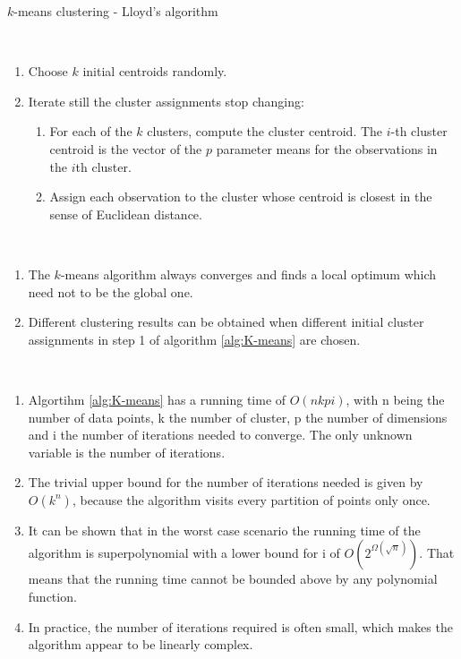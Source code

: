	
\begin{algorithm}
	\caption{$k$-means clustering \cite{Introducion_Stat_Learning} - Lloyd's algorithm}\label{alg:K-means}
\begin{algorithmic}
\\
	\begin{enumerate}
	\item Choose $k$ initial centroids randomly.
	\item  \label{lev:K-means_two}Iterate still the cluster assignments stop changing:
	\begin{enumerate}[label=\emph{\alph*})]
		\item \label{lev:K-means_two_a} For each of the $k$ clusters, compute the cluster centroid. The $i$-th cluster centroid is the vector of the $p$ parameter means for the observations in the $i$th cluster. 
		\item \label{lev:K-means_two_b}Assign each observation to the cluster whose centroid is closest in the sense of Euclidean distance. 
	\end{enumerate}
	\end{enumerate}
\end{algorithmic}
\end{algorithm}

\begin{remark}~
	\begin{enumerate}[label=(\roman*)]
		\item The $k$-means algorithm always converges and finds a local optimum which need not to be the global one.
		\item Different clustering results can be obtained when different initial cluster assignments in step 1 of algorithm \ref{alg:K-means} are chosen.
	\end{enumerate}
\end{remark}

\begin{remark}~
	\begin{enumerate}[label=(\roman*)]
		\item Algortihm \ref{alg:K-means} has a running time of $O(nkpi)$, with n being the number of data points, k the number of cluster, p the number of dimensions and i the number of iterations needed to converge. The only unknown variable is the number of iterations. 
		\item The trivial upper bound for the number of iterations needed is given by $O(k^n)$, because the algorithm visits every partition of points only once. 
		\item It can be shown \cite{arthur2006slow} that in the worst case scenario the running time of the algorithm is superpolynomial with a lower bound for i of  $O(2^{\Omega(\sqrt{n})})$. That means that the running time cannot be bounded above by any polynomial function.
		\item In practice, the number of iterations required is often small, which makes the algorithm appear to be linearly complex.  
	\end{enumerate}
\end{remark}

